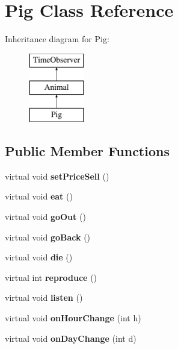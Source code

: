 \hypertarget{class_pig}{}\section{Pig Class Reference}
\label{class_pig}
Inheritance diagram for Pig\+:\begin{figure}[H]
\begin{center}
\leavevmode
\includegraphics[height=3.000000cm]{class_pig}
\end{center}
\end{figure}
\subsection*{Public Member Functions}
\begin{DoxyCompactItemize}
\item 
\mbox{\label{class_pig_a0211e2fe87af7df616125ea0c3c49b9b}} 
virtual void {\bfseries set\+Price\+Sell} ()
\item 
\mbox{\label{class_pig_a101d2ba5c0384f287a4d762c0b103929}} 
virtual void {\bfseries eat} ()
\item 
\mbox{\label{class_pig_a346e5a198e9a2208afda64f271e18ce4}} 
virtual void {\bfseries go\+Out} ()
\item 
\mbox{\label{class_pig_a8910acc68ea058501b8bb9d2e104f3db}} 
virtual void {\bfseries go\+Back} ()
\item 
\mbox{\label{class_pig_ac6f4adb5d005de651af8b2769f693638}} 
virtual void {\bfseries die} ()
\item 
\mbox{\label{class_pig_a50a4bb2ccc915d430270b032a463de66}} 
virtual int {\bfseries reproduce} ()
\item 
\mbox{\label{class_pig_a378287d4b572a3d803e2066ec1a5176a}} 
virtual void {\bfseries listen} ()
\item 
\mbox{\label{class_pig_a23b39de69985c6128a71d6f2f8bf034a}} 
virtual void {\bfseries on\+Hour\+Change} (int h)
\item 
\mbox{\label{class_pig_a217d0b26a1919076b5f0d8b5869ab8cc}} 
virtual void {\bfseries on\+Day\+Change} (int d)
\end{DoxyCompactItemize}
